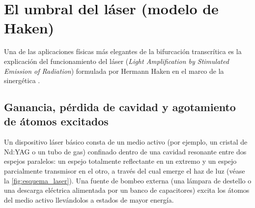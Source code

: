 \section{El umbral del láser (modelo de Haken)}

Una de las aplicaciones físicas más elegantes de la bifurcación transcrítica es la explicación del funcionamiento del láser (\emph{Light Amplification by Stimulated Emission of Radiation}) formulada por Hermann Haken en el marco de la sinergética \cite{haken1983}.

\subsection{Ganancia, pérdida de cavidad y agotamiento de átomos excitados}

Un dispositivo láser básico consta de un medio activo (por ejemplo, un cristal de Nd:YAG o un tubo de gas) confinado dentro de una cavidad resonante entre dos espejos paralelos: un espejo totalmente reflectante en un extremo y un espejo parcialmente transmisor en el otro, a través del cual emerge el haz de luz (véase la \cref{fig:esquema_laser}). Una fuente de bombeo externa (una lámpara de destello o una descarga eléctrica alimentada por un banco de capacitores) excita los átomos del medio activo llevándolos a estados de mayor energía.

